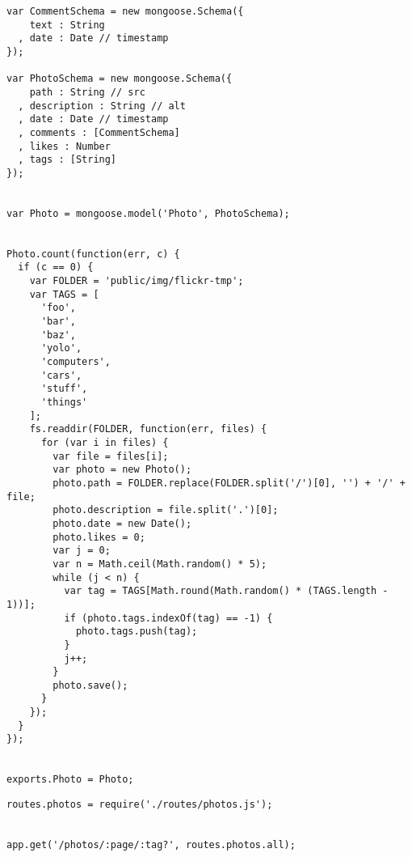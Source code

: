 \documentclass{article}
\begin{document}
\begin{verbatim}
var CommentSchema = new mongoose.Schema({
    text : String
  , date : Date // timestamp
});

var PhotoSchema = new mongoose.Schema({
    path : String // src
  , description : String // alt
  , date : Date // timestamp
  , comments : [CommentSchema]
  , likes : Number
  , tags : [String]
});


var Photo = mongoose.model('Photo', PhotoSchema);


Photo.count(function(err, c) {
  if (c == 0) {
    var FOLDER = 'public/img/flickr-tmp';
    var TAGS = [
      'foo',
      'bar',
      'baz',
      'yolo',
      'computers',
      'cars',
      'stuff',
      'things'
    ];
    fs.readdir(FOLDER, function(err, files) {
      for (var i in files) {
        var file = files[i];
        var photo = new Photo();
        photo.path = FOLDER.replace(FOLDER.split('/')[0], '') + '/' + file;
        photo.description = file.split('.')[0];
        photo.date = new Date();
        photo.likes = 0;
        var j = 0;
        var n = Math.ceil(Math.random() * 5);
        while (j < n) {
          var tag = TAGS[Math.round(Math.random() * (TAGS.length - 1))];
          if (photo.tags.indexOf(tag) == -1) {
            photo.tags.push(tag);
          }
          j++;
        }
        photo.save();
      }
    });
  }
});


exports.Photo = Photo;
\end{verbatim}


\begin{verbatim}
routes.photos = require('./routes/photos.js');


app.get('/photos/:page/:tag?', routes.photos.all);
\end{verbatim}

\end{document}
